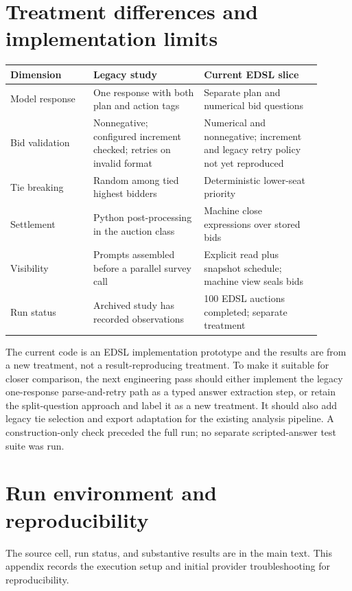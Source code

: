 \documentclass[11pt]{article}
\begin{document}
\clearpage
\appendix
\section{Treatment differences and implementation limits}

\begin{longtable}{p{0.24\linewidth}p{0.32\linewidth}p{0.34\linewidth}}
\toprule
Dimension & Legacy study & Current EDSL slice \\
\midrule
\endhead
Model response & One response with both plan and action tags & Separate plan and numerical bid questions \\
Bid validation & Nonnegative; configured increment checked; retries on invalid format & Numerical and nonnegative; increment and legacy retry policy not yet reproduced \\
Tie breaking & Random among tied highest bidders & Deterministic lower-seat priority \\
Settlement & Python post-processing in the auction class & Machine close expressions over stored bids \\
Visibility & Prompts assembled before a parallel survey call & Explicit read plus snapshot schedule; machine view seals bids \\
Run status & Archived study has recorded observations & 100 EDSL auctions completed; separate treatment \\
\bottomrule
\end{longtable}

The current code is an EDSL implementation prototype and the results are from a new treatment, not a result-reproducing treatment. To make it suitable for closer comparison, the next engineering pass should either implement the legacy one-response parse-and-retry path as a typed answer extraction step, or retain the split-question approach and label it as a new treatment. It should also add legacy tie selection and export adaptation for the existing analysis pipeline. A construction-only check preceded the full run; no separate scripted-answer test suite was run.

\section{Run environment and reproducibility}

The source cell, run status, and substantive results are in the main text. This appendix records the execution setup and initial provider troubleshooting for reproducibility.
\end{document}
